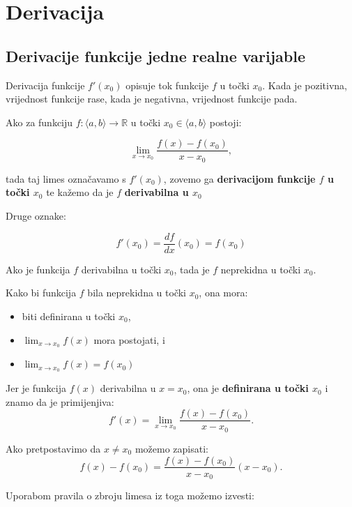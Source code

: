 \section{Derivacija}
\subsection{Derivacije funkcije jedne realne varijable}

Derivacija funkcije $f'(x_0)$ opisuje tok funkcije $f$ u točki $x_0$. Kada je
pozitivna, vrijednost funkcije rase, kada je negativna, vrijednost funkcije pada.

\begin{definition}
    \label{def:diff}
    Ako za funkciju $f:\langle a,b\rangle \to \mathbb{R}$ u točki $x_0\in\langle a,b\rangle$ postoji:

    $$
        \lim_{x\to x_0} \frac{f(x) - f(x_0)}{x-x_0},
    $$

    tada taj limes označavamo s $f'(x_0)$, zovemo ga \textbf{derivacijom funkcije $f$ u točki $x_0$}
    te kažemo da je $f$ \textbf{derivabilna u $x_0$}
\end{definition}

Druge oznake:

$$
f'(x_0) = \frac{df}{dx}(x_0) = f(x_0)
$$

\begin{proposition}
    Ako je funkcija $f$ derivabilna u točki $x_0$, tada je $f$ neprekidna u točki $x_0$.
\end{proposition}

Kako bi funkcija $f$ bila neprekidna u točki $x_0$, ona mora:
\begin{itemize}
    \item biti definirana u točki $x_0$,
    \item $\lim_{x\to x_0}f(x)$ mora postojati, i
    \item $\lim_{x\to x_0}f(x) = f(x_0)$
\end{itemize}

Jer je funkcija $f(x)$ derivabilna u $x=x_0$, ona je \textbf{definirana u točki $x_0$} i znamo da je  primijenjiva:
$$
f'(x) = \lim_{x\to x_0} \frac{f(x) - f(x_0)}{x-x_0}.
$$

Ako pretpostavimo da $x\neq x_0$ možemo zapisati:
$$
f(x) - f(x_0) = \frac{f(x)-f(x_0)}{x-x_0}(x-x_0).
$$

Uporabom pravila o zbroju limesa iz toga možemo izvesti:

